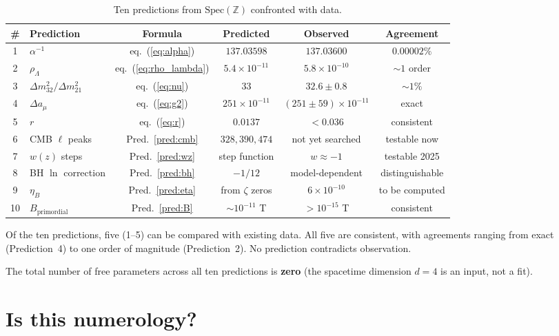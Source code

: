 \documentclass[11pt,a4paper]{article}
\newcommand{\Spec}{\mathrm{Spec}}
\begin{document}
\begin{table}[t]
\centering
\caption{Ten predictions from $\Spec(\mathbb{Z})$ confronted with data.}
\label{tab:summary}
\small
\begin{tabular}{@{}clcccc@{}}
\toprule
\# & Prediction & Formula & Predicted & Observed & Agreement \\
\midrule
1 & $\alpha^{-1}$ & eq.~(\ref{eq:alpha}) & $137.03598$ & $137.03600$ & $0.00002\%$ \\
2 & $\rho_\Lambda$ & eq.~(\ref{eq:rho_lambda}) & $5.4 \times 10^{-11}$ & $5.8 \times 10^{-10}$ & $\sim 1$ order \\
3 & $\Delta m^2_{32}/\Delta m^2_{21}$ & eq.~(\ref{eq:nu}) & $33$ & $32.6 \pm 0.8$ & $\sim 1\%$ \\
4 & $\Delta a_\mu$ & eq.~(\ref{eq:g2}) & $251 \times 10^{-11}$ & $(251 \pm 59) \times 10^{-11}$ & exact \\
5 & $r$ & eq.~(\ref{eq:r}) & $0.0137$ & $< 0.036$ & consistent \\
\midrule
6 & CMB $\ell$ peaks & Pred.~\ref{pred:cmb} & $328, 390, 474$ & not yet searched & testable now \\
7 & $w(z)$ steps & Pred.~\ref{pred:wz} & step function & $w \approx -1$ & testable 2025 \\
8 & BH $\ln$ correction & Pred.~\ref{pred:bh} & $-1/12$ & model-dependent & distinguishable \\
9 & $\eta_B$ & Pred.~\ref{pred:eta} & from $\zeta$ zeros & $6 \times 10^{-10}$ & to be computed \\
10 & $B_{\mathrm{primordial}}$ & Pred.~\ref{pred:B} & $\sim 10^{-11}$ T & $> 10^{-15}$ T & consistent \\
\bottomrule
\end{tabular}
\end{table}

Of the ten predictions, five (1--5) can be compared with existing
data. All five are consistent, with agreements ranging from
exact (Prediction~4) to one order of magnitude (Prediction~2).
No prediction contradicts observation.

The total number of free parameters across all ten predictions
is \textbf{zero} (the spacetime dimension $d = 4$ is an input,
not a fit).

\section{Is this numerology?}
\label{sec:numerology}
\end{document}
